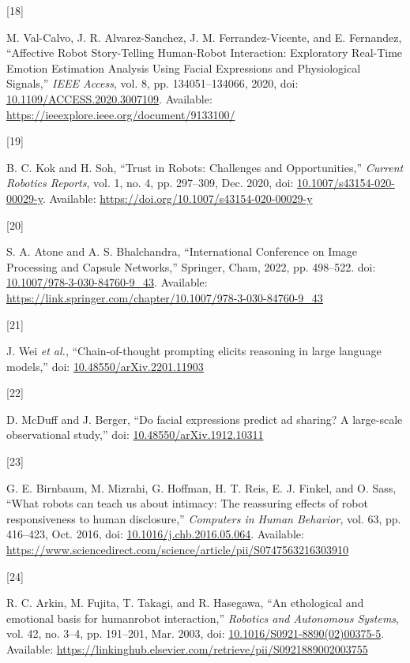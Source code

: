 \documentclass[
  letterpaper,
  DIV=11,
  numbers=noendperiod]{scrartcl}
\newlength{\cslhangindent}
\newlength{\csllabelwidth}
\newenvironment{CSLReferences}[2] %
 {\begin{list}{}{%
  \setlength{\itemindent}{0pt}
  \setlength{\leftmargin}{0pt}
  \setlength{\parsep}{0pt}
  \ifodd #1
   \setlength{\leftmargin}{\cslhangindent}
   \setlength{\itemindent}{-1\cslhangindent}
  \fi
  \setlength{\itemsep}{#2\baselineskip}}}
 {\end{list}}
\newcommand{\CSLLeftMargin}[1]{\parbox[t]{\csllabelwidth}{\strut#1\strut}}
\newcommand{\CSLRightInline}[1]{\parbox[t]{\linewidth - \csllabelwidth}{\strut#1\strut}}
\begin{document}
\begin{CSLReferences}{0}{0}
\CSLLeftMargin{{[}18{]} }%
\CSLRightInline{M. Val-Calvo, J. R. Alvarez-Sanchez, J. M.
Ferrandez-Vicente, and E. Fernandez, {``Affective Robot Story-Telling
Human-Robot Interaction: Exploratory Real-Time Emotion Estimation
Analysis Using Facial Expressions and Physiological Signals,''}
\emph{IEEE Access}, vol. 8, pp. 134051--134066, 2020, doi:
\href{https://doi.org/10.1109/ACCESS.2020.3007109}{10.1109/ACCESS.2020.3007109}.
Available: \url{https://ieeexplore.ieee.org/document/9133100/}}

\CSLLeftMargin{{[}19{]} }%
\CSLRightInline{B. C. Kok and H. Soh, {``Trust in Robots: Challenges and
Opportunities,''} \emph{Current Robotics Reports}, vol. 1, no. 4, pp.
297--309, Dec. 2020, doi:
\href{https://doi.org/10.1007/s43154-020-00029-y}{10.1007/s43154-020-00029-y}.
Available: \url{https://doi.org/10.1007/s43154-020-00029-y}}

\CSLLeftMargin{{[}20{]} }%
\CSLRightInline{S. A. Atone and A. S. Bhalchandra, {``International
Conference on Image Processing and Capsule Networks,''} Springer, Cham,
2022, pp. 498--522. doi:
\href{https://doi.org/10.1007/978-3-030-84760-9_43}{10.1007/978-3-030-84760-9\_43}.
Available:
\url{https://link.springer.com/chapter/10.1007/978-3-030-84760-9_43}}

\CSLLeftMargin{{[}21{]} }%
\CSLRightInline{J. Wei \emph{et al.}, {``Chain-of-thought prompting
elicits reasoning in large language models,''} doi:
\href{https://doi.org/10.48550/arXiv.2201.11903}{10.48550/arXiv.2201.11903}}

\CSLLeftMargin{{[}22{]} }%
\CSLRightInline{D. McDuff and J. Berger, {``Do facial expressions
predict ad sharing? A large-scale observational study,''} doi:
\href{https://doi.org/10.48550/arXiv.1912.10311}{10.48550/arXiv.1912.10311}}

\CSLLeftMargin{{[}23{]} }%
\CSLRightInline{G. E. Birnbaum, M. Mizrahi, G. Hoffman, H. T. Reis, E.
J. Finkel, and O. Sass, {``What robots can teach us about intimacy: The
reassuring effects of robot responsiveness to human disclosure,''}
\emph{Computers in Human Behavior}, vol. 63, pp. 416--423, Oct. 2016,
doi:
\href{https://doi.org/10.1016/j.chb.2016.05.064}{10.1016/j.chb.2016.05.064}.
Available:
\url{https://www.sciencedirect.com/science/article/pii/S0747563216303910}}

\CSLLeftMargin{{[}24{]} }%
\CSLRightInline{R. C. Arkin, M. Fujita, T. Takagi, and R. Hasegawa,
{``An ethological and emotional basis for human{\textendash}robot
interaction,''} \emph{Robotics and Autonomous Systems}, vol. 42, no.
3--4, pp. 191--201, Mar. 2003, doi:
\href{https://doi.org/10.1016/S0921-8890(02)00375-5}{10.1016/S0921-8890(02)00375-5}.
Available:
\url{https://linkinghub.elsevier.com/retrieve/pii/S0921889002003755}}


\end{CSLReferences}
\end{document}
